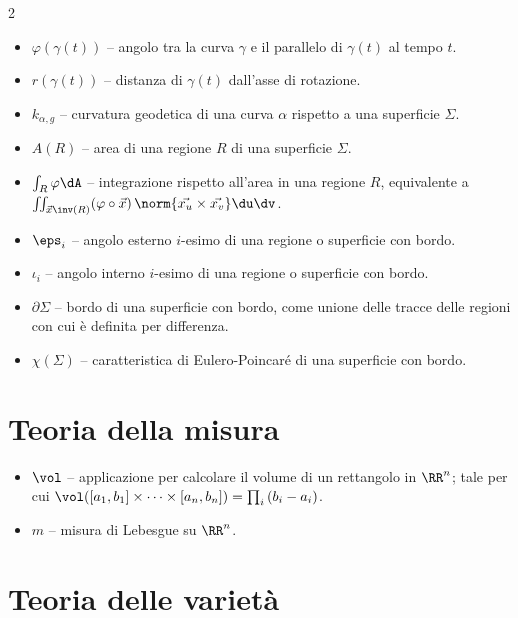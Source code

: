 \begin{multicols*}{2}
\begin{itemize}
            \item $\varphi(\gamma(t))$ -- angolo tra la curva $\gamma$ e il parallelo di $\gamma(t)$ al tempo $t$.
            \item $r(\gamma(t))$ -- distanza di $\gamma(t)$ dall'asse di rotazione.
            \item $k_{\alpha, g}$ -- curvatura geodetica di una curva $\alpha$ rispetto a una superficie $\Sigma$.
            \item $A(R)$ -- area di una regione $R$ di una superficie $\Sigma$.
            \item $\int_R \varphi \dA$ -- integrazione rispetto all'area in una regione $R$, equivalente a $\iint_{\vec{x}\inv(R)} (\varphi \circ \vec{x}) \, \norm{\vec{x_u} \times \vec{x_v}} \du \dv$.
            \item $\eps_i$ -- angolo esterno $i$-esimo di una regione o superficie con bordo.
            \item $\iota_i$ -- angolo interno $i$-esimo di una regione o superficie con bordo.
            \item $\partial \Sigma$ -- bordo di una superficie con bordo, come unione delle tracce delle regioni con cui è definita per differenza.
            \item $\chi(\Sigma)$ -- caratteristica di Eulero-Poincaré di una superficie con bordo.
      \end{itemize}

      \section*{Teoria della misura}

      \begin{itemize}
            \item $\vol$ -- applicazione per calcolare il volume di un rettangolo in $\RR^n$; tale per cui
                  $\vol([a_1, b_1] \times \cdots \times [a_n, b_n]) = \prod_i {(b_i - a_i)}$.
            \item $m$ -- misura di Lebesgue su $\RR^n$.
      \end{itemize}

      \section*{Teoria delle varietà}


\end{multicols*}
